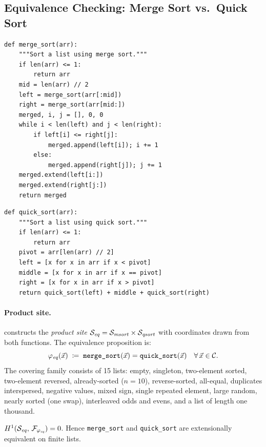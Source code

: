 \subsection{Equivalence Checking: Merge Sort vs.\ Quick Sort}%
\label{sec:app-equiv}

\begin{lstlisting}[style=jugeo-python,caption={Merge sort.},label={lst:mergesort}]
def merge_sort(arr):
    """Sort a list using merge sort."""
    if len(arr) <= 1:
        return arr
    mid = len(arr) // 2
    left = merge_sort(arr[:mid])
    right = merge_sort(arr[mid:])
    merged, i, j = [], 0, 0
    while i < len(left) and j < len(right):
        if left[i] <= right[j]:
            merged.append(left[i]); i += 1
        else:
            merged.append(right[j]); j += 1
    merged.extend(left[i:])
    merged.extend(right[j:])
    return merged
\end{lstlisting}

\begin{lstlisting}[style=jugeo-python,caption={Quick sort.},label={lst:quicksort}]
def quick_sort(arr):
    """Sort a list using quick sort."""
    if len(arr) <= 1:
        return arr
    pivot = arr[len(arr) // 2]
    left = [x for x in arr if x < pivot]
    middle = [x for x in arr if x == pivot]
    right = [x for x in arr if x > pivot]
    return quick_sort(left) + middle + quick_sort(right)
\end{lstlisting}

\paragraph{Product site.}
\JuGeo{} constructs the \emph{product site}
$\mathcal{S}_{\mathit{eq}} = \mathcal{S}_{\mathit{msort}} \times \mathcal{S}_{\mathit{qsort}}$
with coordinates drawn from both functions.  The equivalence
proposition is:
\[
  \varphi_{\mathit{eq}}(\vec{x}) \;\coloneqq\;
  \texttt{merge\_sort}(\vec{x}) = \texttt{quick\_sort}(\vec{x})
  \quad \forall\, \vec{x}\in\mathcal{C}.
\]
The covering family consists of 15 lists: empty, singleton,
two-element sorted, two-element reversed, already-sorted ($n=10$),
reverse-sorted, all-equal, duplicates interspersed, negative values,
mixed sign, single repeated element, large random, nearly sorted
(one swap), interleaved odds and evens, and a list of length one
thousand.

\begin{theorem}\label{thm:equiv-sort}
$H^{1}(\mathcal{S}_{\mathit{eq}},\,\mathcal{F}_{\varphi_{\mathit{eq}}}) = 0$.
Hence \texttt{merge\_sort} and \texttt{quick\_sort} are extensionally
equivalent on finite lists.
\end{theorem}

